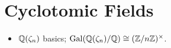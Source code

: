 \section{Cyclotomic Fields}
\begin{itemize}
  \item $\mathbb{Q}(\zeta_n)$ basics; $\mathrm{Gal}(\mathbb{Q}(\zeta_n)/\mathbb{Q})\cong(\mathbb{Z}/n\mathbb{Z})^\times$.
\end{itemize}
